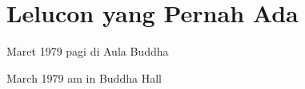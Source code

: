 \chapter{Lelucon yang Pernah Ada} %

 Maret 1979 pagi di Aula Buddha

 March 1979 am in Buddha Hall
